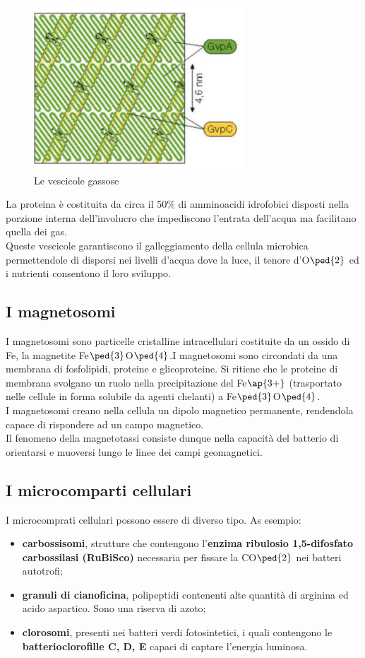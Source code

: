 \documentclass[11pt]{book}
\begin{document}
\begin{figure}[htp]
\centering
\includegraphics[scale=0.5]{img/Vescicole gassose.png}
\caption{Le vescicole gassose}
\label{}
\end{figure}

La proteina è costituita da circa il 50$\%$ di amminoacidi idrofobici disposti nella porzione interna dell’involucro che impediscono l’entrata dell’acqua ma facilitano quella dei gas.\\
Queste vescicole garantiscono il galleggiamento della cellula microbica permettendole di disporsi nei livelli d’acqua dove la luce, il tenore d’O$\ped{2}$ ed i nutrienti consentono il loro sviluppo.

\subsection{I magnetosomi}
I magnetosomi sono particelle cristalline intracellulari costituite da un ossido di Fe, la magnetite Fe$\ped{3}$O$\ped{4}$.I magnetosomi sono circondati da una membrana di fosfolipidi, proteine e glicoproteine. Si ritiene che le proteine di membrana svolgano un ruolo nella
precipitazione del Fe$\ap{3+}$ (trasportato nelle cellule in forma solubile da agenti chelanti) a Fe$\ped{3}$O$\ped{4}$.\\
I magnetosomi creano nella cellula un dipolo magnetico permanente, rendendola capace di rispondere ad un campo magnetico.\\

Il fenomeno della magnetotassi consiste dunque nella capacità del batterio di orientarsi e muoversi lungo le linee dei campi geomagnetici. 


\subsection{I microcomparti cellulari}
I microcomprati cellulari possono essere di diverso tipo. As esempio:
\begin{itemize}
\item \textbf{carbossisomi}, strutture che contengono l’\textbf{enzima ribulosio 1,5-difosfato carbossilasi (RuBiSco)} necessaria per fissare la CO$\ped{2}$ nei batteri autotrofi;
\item \textbf{granuli di cianoficina}, polipeptidi contenenti alte quantità di arginina ed acido aspartico. Sono una riserva di azoto;
\item \textbf{clorosomi}, presenti nei batteri verdi fotosintetici, i quali contengono le \textbf{batterioclorofille C, D, E} capaci di captare l’energia luminosa.
\end{itemize}
\end{document}
